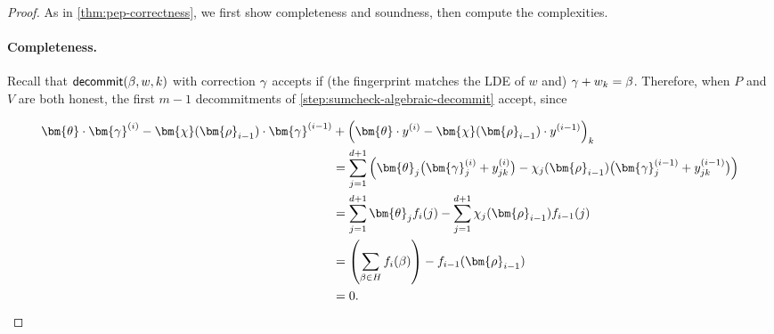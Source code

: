 \documentclass[a4paper,UKenglish,cleveref, autoref, thm-restate]{lipics-v2021}
\theoremstyle{definition}
\newcommand{\pcommitstring}{y}
\newcommand{\dimension}{m}
\newcommand{\degree}{d}
\newcommand{\fingerprinttuple}{\bm{\rho}}
\newcommand{\cubeside}{H}
\def\fe#1{
    \ifnum#1=1
        \alpha
    \else
    \ifnum#1=2
        \beta
    \else
    \ifnum#1=3
        \gamma
    \fi\fi\fi
}
\begin{document}
\begin{proof}
    As in \cref{thm:pep-correctness}, we first show completeness and soundness, then compute the complexities.
    
    \paragraph*{Completeness\iflipics\else.\fi} Recall that $\textsf{decommit}(\fe2, w, k)$ with correction $\fe3$ accepts if (the fingerprint matches the LDE of $w$ and) $\fe3 + w_k = \fe2$. Therefore, when $P$ and $V$ are both honest, the first $\dimension - 1$ decommitments of \cref{step:sumcheck-algebraic-decommit} accept, since
    
    \begin{align*}
        \bm{\theta} \cdot \bm{\fe3}^{(i)} - \bm{\chi}(\fingerprinttuple_{i-1}) \cdot \bm{\fe3}^{(i-1)} &+ \left(\bm{\theta} \cdot \pcommitstring^{(i)} - \bm{\chi}(\fingerprinttuple_{i-1}) \cdot \pcommitstring^{(i-1)}\right)_k\\
        &= \sum_{j = 1}^{\degree + 1} \left(\bm{\theta}_j \big(\bm{\fe3}^{(i)}_j + \pcommitstring^{(i)}_{jk}\big) - \chi_j(\fingerprinttuple_{i-1}) \big(\bm{\fe3}^{(i-1)}_j + \pcommitstring^{(i-1)}_{jk}\big)\right)\\
        &= \sum_{j = 1}^{\degree + 1} \bm{\theta}_j f_i(j) - \sum_{j = 1}^{\degree + 1} \chi_j(\fingerprinttuple_{i-1})
         f_{i-1}(j)\\
        &= \left(\sum_{\fe2 \in \cubeside} f_i(\fe2)\right) - f_{i-1}(\fingerprinttuple_{i-1})\\
        &= 0.
    \end{align*}
    

\end{proof}
\end{document}
